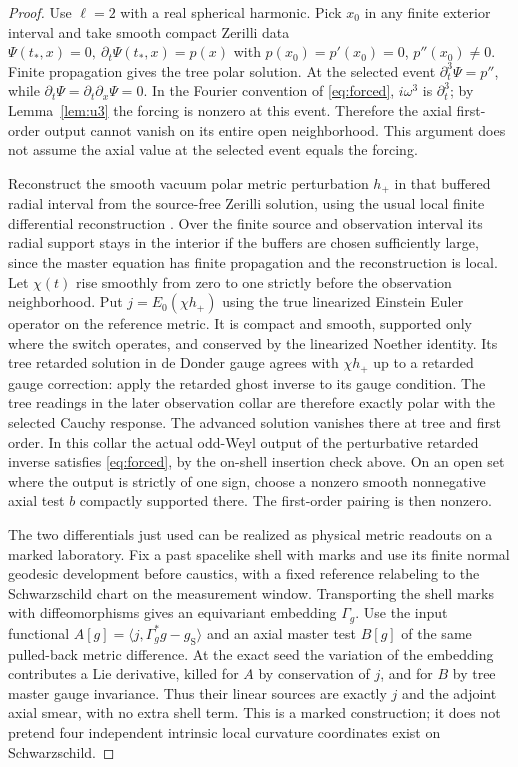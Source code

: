 \documentclass[11pt]{article}
\newcommand{\Sch}{g_{\mathrm S}}
\begin{document}
\begin{proof}
Use \(\ell=2\) with a real spherical harmonic. Pick \(x_0\) in any finite exterior interval and take smooth compact Zerilli data \(\Psi(t_*,x)=0,\ \partial_t\Psi(t_*,x)=p(x)\) with \(p(x_0)=p'(x_0)=0\), \(p''(x_0)\ne0\). Finite propagation gives the tree polar solution. At the selected event \(\partial_t^3\Psi=p''\), while \(\partial_t\Psi=\partial_t\partial_x\Psi=0\). In the Fourier convention of \eqref{eq:forced}, \(i\omega^3\) is \(\partial_t^3\); by Lemma~\ref{lem:u3} the forcing is nonzero at this event. Therefore the axial first-order output cannot vanish on its entire open neighborhood. This argument does not assume the axial value at the selected event equals the forcing.

Reconstruct the smooth vacuum polar metric perturbation \(h_+\) in that buffered radial interval from the source-free Zerilli solution, using the usual local finite differential reconstruction \cite{Moncrief,MartelPoisson}. Over the finite source and observation interval its radial support stays in the interior if the buffers are chosen sufficiently large, since the master equation has finite propagation and the reconstruction is local. Let \(\chi(t)\) rise smoothly from zero to one strictly before the observation neighborhood. Put \(j=E_0(\chi h_+)\) using the true linearized Einstein Euler operator on the reference metric. It is compact and smooth, supported only where the switch operates, and conserved by the linearized Noether identity. Its tree retarded solution in de Donder gauge agrees with \(\chi h_+\) up to a retarded gauge correction: apply the retarded ghost inverse to its gauge condition. The tree readings in the later observation collar are therefore exactly polar with the selected Cauchy response. The advanced solution vanishes there at tree and first order. In this collar the actual odd-Weyl output of the perturbative retarded inverse satisfies \eqref{eq:forced}, by the on-shell insertion check above. On an open set where the output is strictly of one sign, choose a nonzero smooth nonnegative axial test \(b\) compactly supported there. The first-order pairing is then nonzero.

The two differentials just used can be realized as physical metric readouts on a marked laboratory. Fix a past spacelike shell with marks and use its finite normal geodesic development before caustics, with a fixed reference relabeling to the Schwarzschild chart on the measurement window. Transporting the shell marks with diffeomorphisms gives an equivariant embedding \(\Gamma_g\). Use the input functional \(A[g]=\langle j,\Gamma_g^*g-\Sch\rangle\) and an axial master test \(B[g]\) of the same pulled-back metric difference. At the exact seed the variation of the embedding contributes a Lie derivative, killed for \(A\) by conservation of \(j\), and for \(B\) by tree master gauge invariance. Thus their linear sources are exactly \(j\) and the adjoint axial smear, with no extra shell term. This is a marked construction; it does not pretend four independent intrinsic local curvature coordinates exist on Schwarzschild.


\end{proof}
\end{document}
